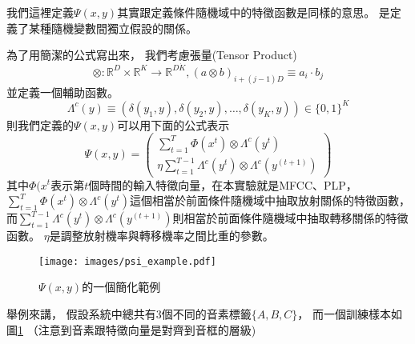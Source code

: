     我們這裡定義$\Psi(x, y)$其實跟定義條件隨機域中的特徵函數是同樣的意思。
    是定義了某種隨機變數間獨立假設的關係。

    為了用簡潔的公式寫出來，
    我們考慮張量(Tensor Product)
    \begin{equation}
      \otimes: \mathbb{R}^D \times \mathbb{R}^K \rightarrow \mathbb{R}^{D \dot K}, (a \otimes b)_{i + (j-1) D} \equiv a_i \cdot b_j
    \end{equation}
    並定義一個輔助函數。
    \begin{equation}
      \Lambda^{c}(y) \equiv (\delta(y_1, y), \delta(y_2, y), \ldots, \delta(y_K, y)) \in \lbrace 0, 1 \rbrace^K
    \end{equation}
    則我們定義的$\Psi(x,y)$可以用下面的公式表示
    \begin{equation}
      \Psi(x, y) = 
      \left( 
	\begin{array}{l}
	  \sum_{t=1}^T \Phi(x^t) \otimes \Lambda^{c} (y^t) \\
	  \eta \sum_{t=1}^{T-1} \Lambda^{c} (y^t) \otimes \Lambda^{c} (y^{(t+1)})
	\end{array} 
      \right)
    \end{equation}
    其中$\Phi(x^t$表示第$t$個時間的輸入特徵向量，在本實驗就是MFCC、PLP，
    $\sum_{t=1}^T \Phi(x^t) \otimes \Lambda^{c} (y^t)$這個相當於前面條件隨機域中抽取放射關係的特徵函數，
    而$\sum_{t=1}^{T-1} \Lambda^{c} (y^t) \otimes \Lambda^{c} (y^{(t+1)})$則相當於前面條件隨機域中抽取轉移關係的特徵函數。
    $\eta$是調整放射機率與轉移機率之間比重的參數。

    \begin{figure}
        \begin{center}
        \texttt{[image: images/psi\_example.pdf]}
        \end{center}
        \caption{$\Psi(x, y)$的一個簡化範例}
        \label{fig:psi_example}
    \end{figure}
    舉例來講，
    假設系統中總共有3個不同的音素標籤$\lbrace A, B, C \rbrace$，
    而一個訓練樣本如圖\ref{fig:psi_example}
    （注意到音素跟特徵向量是對齊到音框的層級)
   
